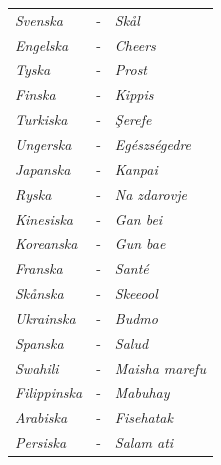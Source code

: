 \begin{tabular}{l l l}
    \textit{Svenska} & - & \hspace{10pt} \textit{Skål} \\
    \textit{Engelska} & - & \hspace{10pt} \textit{Cheers} \\
    \textit{Tyska} & - & \hspace{10pt} \textit{Prost} \\
    \textit{Finska} & - & \hspace{10pt} \textit{Kippis} \\
    \textit{Turkiska} & - & \hspace{10pt} \textit{Şerefe} \\
    \textit{Ungerska} & - & \hspace{10pt} \textit{Egészségedre} \\
    \textit{Japanska} & - & \hspace{10pt} \textit{Kanpai} \\
    \textit{Ryska} & - & \hspace{10pt} \textit{Na zdarovje} \\
    \textit{Kinesiska} & - & \hspace{10pt} \textit{Gan bei} \\
    \textit{Koreanska} & - & \hspace{10pt} \textit{Gun bae} \\
    \textit{Franska} & - & \hspace{10pt} \textit{Santé} \\
    \textit{Skånska} & - & \hspace{10pt} \textit{Skeeool} \\
    \textit{Ukrainska} & - & \hspace{10pt} \textit{Budmo} \\
    \textit{Spanska} & - & \hspace{10pt} \textit{Salud} \\
    \textit{Swahili} & - & \hspace{10pt} \textit{Maisha marefu} \\
    \textit{Filippinska} & - & \hspace{10pt} \textit{Mabuhay} \\
    \textit{Arabiska} & - & \hspace{10pt} \textit{Fisehatak} \\
    \textit{Persiska} & - & \hspace{10pt} \textit{Salam ati} \\

\end{tabular}
